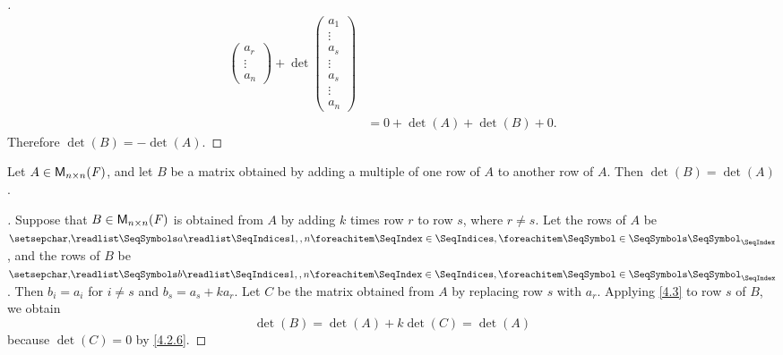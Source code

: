 \begin{proof}[]
\begin{align*}
\begin{pmatrix}
                                                        a_r    \\
                                                        \vdots \\
                                                        a_n
                                                      \end{pmatrix} + \det\begin{pmatrix}
                                                                            a_1    \\
                                                                            \vdots \\
                                                                            a_s    \\
                                                                            \vdots \\
                                                                            a_s    \\
                                                                            \vdots \\
                                                                            a_n
                                                                          \end{pmatrix} \\
      & = 0 + \det(A) + \det(B) + 0.
  \end{align*}
  Therefore \(\det(B) = -\det(A)\).
\end{proof}

\begin{thm}\label{4.6}
  Let \(A \in \mathsf{M}_{{n} \times n}({\mathit{F}})\), and let \(B\) be a matrix obtained by adding a multiple of one row of \(A\) to another row of \(A\).
  Then \(\det(B) = \det(A)\).
\end{thm}

\begin{proof}[]
  Suppose that \(B \in \mathsf{M}_{{n} \times n}({\mathit{F}})\) is obtained from \(A\) by adding \(k\) times row \(r\) to row \(s\), where \(r \neq s\).
  Let the rows of \(A\) be \(\seq{a}{1,,n}\), and the rows of \(B\) be \(\seq{b}{1,,n}\).
  Then \(b_i = a_i\) for \(i \neq s\) and \(b_s = a_s + k a_r\).
  Let \(C\) be the matrix obtained from \(A\) by replacing row \(s\) with \(a_r\).
  Applying \cref{4.3} to row \(s\) of \(B\), we obtain
  \[
    \det(B) = \det(A) + k \det(C) = \det(A)
  \]
  because \(\det(C) = 0\) by \cref{4.2.6}.
\end{proof}
